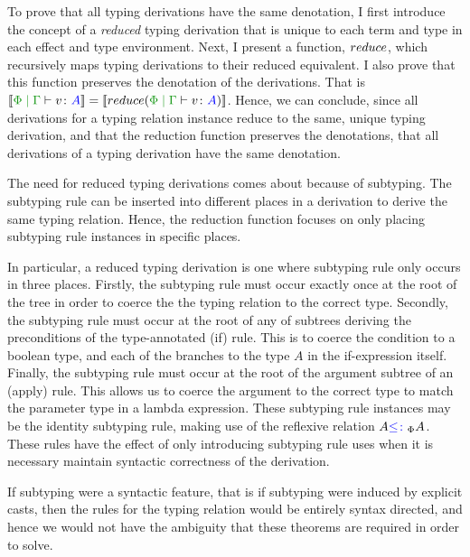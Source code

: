 To prove that all typing derivations have the same denotation, I first introduce the concept of a \textit{reduced} typing derivation that is unique to each term and type in each effect and type environment. Next, I present a function, $reduce$, which recursively maps  typing derivations to their reduced equivalent. I also prove that this function preserves the denotation of the derivations. That is $\deno{\gpetyperelation{v}{A}} = \deno{\reduce(\gpetyperelation{v}{A})}$. Hence, we can conclude, since all derivations for a typing relation instance reduce to the same, unique typing derivation, and that the reduction function preserves the denotations, that all derivations of a typing derivation have the same denotation.

The need for reduced typing derivations comes about because of subtyping. The subtyping rule can be inserted into different places in a derivation to derive the same typing relation. Hence, the reduction function focuses on only placing subtyping rule instances in specific places. 

In particular, a reduced typing derivation is one where subtyping rule only occurs in three places. Firstly, the subtyping rule must occur exactly once at the root of the tree in order to coerce the the typing relation to the correct type. Secondly, the subtyping rule must occur at the root of any of subtrees deriving the preconditions of the type-annotated (if) rule. This is to coerce the condition to a boolean type, and each of the branches to the type $A$ in the if-expression itself. Finally, the subtyping rule must occur at the root of the argument subtree of an (apply) rule. This allows us to coerce the argument to the correct type to match the parameter type in a lambda expression. These subtyping rule instances may be the identity subtyping rule, making use of the reflexive relation $A {\color{blue} \leq\colon}_\Phi A$. These rules have the effect of only introducing subtyping rule uses when it is necessary maintain syntactic correctness of the derivation. 

\begin{aside}
    If subtyping were a syntactic feature, that is if subtyping were induced by explicit casts, then the rules for the typing relation would be entirely syntax directed, and hence we would not have the ambiguity that these theorems are required in order to solve.
\end{aside}


